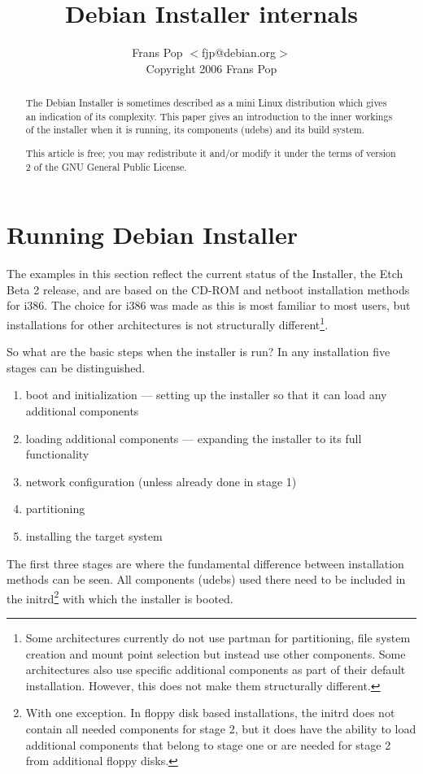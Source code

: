 \documentclass[a4paper,10pt]{article}
\title{Debian Installer internals}
\author{Frans Pop $<$fjp@debian.org$>$ \\
Copyright 2006 Frans Pop}
\begin{document}
\maketitle

\tableofcontents

\begin{abstract}
The Debian Installer is sometimes described as a mini Linux distribution which gives an indication of its complexity. This paper gives an introduction to the inner workings of the installer when it is running, its components (udebs) and its build system.

This article is free; you may redistribute it and/or modify it under the terms of version 2 of the GNU General Public License. 
\end{abstract}

\newpage
\section{Running Debian Installer}

The examples in this section reflect the current status of the Installer, the Etch Beta 2 release, and are based on the CD-ROM and netboot installation methods for i386. The choice for i386 was made as this is most familiar to most users, but installations for other architectures is not structurally different\footnote{Some architectures currently do not use partman for partitioning, file system creation and mount point selection but instead use other components. Some architectures also use specific additional components as part of their default installation. However, this does not make them structurally different.}. 

So what are the basic steps when the installer is run? In any installation five stages can be distinguished. 

\begin{enumerate}
\item boot and initialization — setting up the installer so that it can load any additional components
\item loading additional components — expanding the installer to its full functionality
\item network configuration (unless already done in stage 1)
\item partitioning
\item installing the target system
\end{enumerate}

The first three stages are where the fundamental difference between installation methods can be seen. All components (udebs) used there need to be included in the initrd\footnote{With one exception. In floppy disk based installations, the initrd does not contain all needed components for stage 2, but it does have the ability to load additional components that belong to stage one or are needed for stage 2 from additional floppy disks.} with which the installer is booted. 
\end{document}
